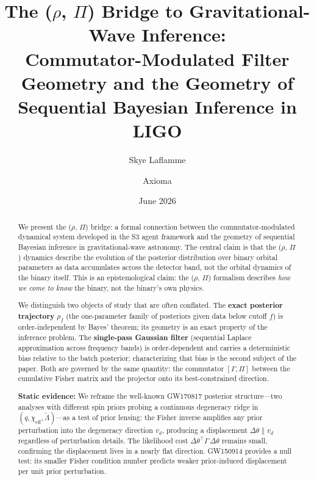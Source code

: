 \documentclass[twocolumn,prd,showpacs,superscriptaddress]{revtex4-2}
\newcommand{\vd}{v_{d}}          %
\begin{document}
\title{The ($\rho$, $\Pi$) Bridge to Gravitational-Wave Inference: \\
Commutator-Modulated Filter Geometry and the Geometry of Sequential Bayesian Inference in LIGO}

\author{Skye Laflamme}
\author{Axioma}

\date{June 2026}

\begin{abstract}
We present the ($\rho$, $\Pi$) bridge: a formal connection between the commutator-modulated dynamical system developed in the S3 agent framework and the geometry of sequential Bayesian inference in gravitational-wave astronomy. The central claim is that the ($\rho$, $\Pi$) dynamics describe the evolution of the posterior distribution over binary orbital parameters as data accumulates across the detector band, not the orbital dynamics of the binary itself. This is an epistemological claim: the ($\rho$, $\Pi$) formalism describes \emph{how we come to know} the binary, not the binary's own physics.

We distinguish two objects of study that are often conflated. The \textbf{exact posterior trajectory} $\rho_f$ (the one-parameter family of posteriors given data below cutoff $f$) is order-independent by Bayes' theorem; its geometry is an exact property of the inference problem. The \textbf{single-pass Gaussian filter} (sequential Laplace approximation across frequency bands) is order-dependent and carries a deterministic bias relative to the batch posterior; characterizing that bias is the second subject of the paper. Both are governed by the same quantity: the commutator $[\Gamma, \Pi]$ between the cumulative Fisher matrix and the projector onto its best-constrained direction.

\textbf{Static evidence:} We reframe the well-known GW170817 posterior structure---two analyses with different spin priors probing a continuous degeneracy ridge in $(q, \chi_{\text{eff}}, \tilde{\Lambda})$---as a test of prior lensing: the Fisher inverse amplifies any prior perturbation into the degeneracy direction $\vd$, producing a displacement $\Delta\theta \parallel \vd$ regardless of perturbation details. The likelihood cost $\Delta\theta^\top\Gamma\,\Delta\theta$ remains small, confirming the displacement lives in a nearly flat direction. GW150914 provides a null test: its smaller Fisher condition number predicts weaker prior-induced displacement per unit prior perturbation.


\end{abstract}
\end{document}
